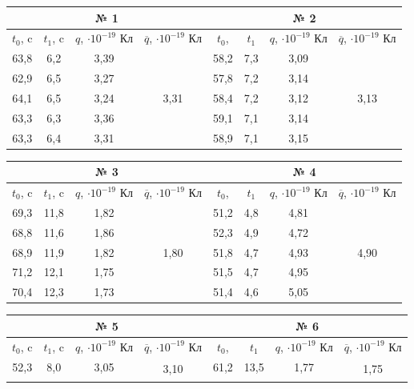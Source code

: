 \documentclass[a4paper, 12pt]{article}%
\begin{document}
\begin{enumerate}
\begin{longtable} {|c|c|c|c|c|c|c|c|}
	\hline
	\multicolumn{4}{|c|}{№ 1} & \multicolumn{4}{c|}{№ 2} \\ \hline
	$t_0$, c& $t_1$, c & $q$, $\cdot 10^{-19}$ Кл & $\overline{q}$, $\cdot 10^{-19}$ Кл & 	$t_0$, & $t_1$ & $q$, $\cdot 10^{-19}$ Кл & $\overline{q}$, $\cdot 10^{-19}$ Кл\\ \hline
	63,8 & 6,2 & 3,39 & \multirow{5}{*}{3,31} & 58,2 & 7,3 & 3,09 & \multirow{5}{*}{3,13}  \\ \hhline{---~---~}
	62,9 & 6,5 & 3,27 &  & 57,8 & 7,2 & 3,14 &  \\ \hhline{---~---~}
	64,1 & 6,5 & 3,24 &  & 58,4 & 7,2 & 3,12 &  \\ \hhline{---~---~}
	63,3 & 6,3 & 3,36 &  & 59,1 & 7,1 & 3,14 &  \\ \hhline{---~---~}
	63,3 & 6,4 & 3,31 &  & 58,9 & 7,1 & 3,15 &  \\ \hline
\end{longtable}
\begin{longtable} {|c|c|c|c|c|c|c|c|}
	\hline
	\multicolumn{4}{|c|}{№ 3} & \multicolumn{4}{c|}{№ 4} \\ \hline
	$t_0$, c& $t_1$, c & $q$, $\cdot 10^{-19}$ Кл & $\overline{q}$, $\cdot 10^{-19}$ Кл & 	$t_0$, & $t_1$ & $q$, $\cdot 10^{-19}$ Кл & $\overline{q}$, $\cdot 10^{-19}$ Кл\\ \hline
	69,3 & 11,8 & 1,82 & \multirow{5}{*}{1,80} & 51,2 & 4,8 & 4,81 & \multirow{5}{*}{4,90} \\ \hhline{---~---~}
	68,8 & 11,6 & 1,86 &  & 52,3 & 4,9 & 4,72 &  \\ \hhline{---~---~}
	68,9 & 11,9 & 1,82 &  & 51,8 & 4,7 & 4,93 &  \\ \hhline{---~---~}
	71,2 & 12,1 & 1,75 &  & 51,5 & 4,7 & 4,95 &  \\ \hhline{---~---~}
	70,4 & 12,3 & 1,73 &  & 51,4 & 4,6 & 5,05 &  \\ \hline
\end{longtable}
\begin{longtable} {|c|c|c|c|c|c|c|c|}
	\hline
	\multicolumn{4}{|c|}{№ 5} & \multicolumn{4}{c|}{№ 6} \\ \hline
	$t_0$, c& $t_1$, c & $q$, $\cdot 10^{-19}$ Кл & $\overline{q}$, $\cdot 10^{-19}$ Кл & 	$t_0$, & $t_1$ & $q$, $\cdot 10^{-19}$ Кл & $\overline{q}$, $\cdot 10^{-19}$ Кл\\ \hline
	52,3 & 8,0 & 3,05 & \multirow{5}{*}{3,10} & 61,2 & 13,5 & 1,77 & \multirow{5}{*}{1,75} \\ \hhline{---~---~}

\end{longtable}
\end{enumerate}
\end{document}
